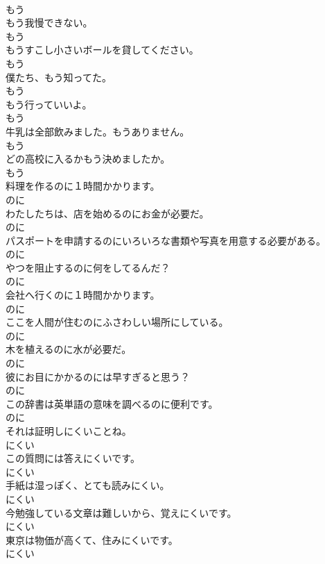 \documentclass[8pt]{extreport}
\begin{document}
\begin{CJK}{UTF8}{min}
\\	もう
\\	もう我慢できない。	
\\	もう
\\	もうすこし小さいボールを貸してください。	
\\	もう
\\	僕たち、もう知ってた。	
\\	もう
\\	もう行っていいよ。	
\\	もう
\\	牛乳は全部飲みました。もうありません。	
\\	もう
\\	どの高校に入るかもう決めましたか。	
\\	もう
\\	料理を作るのに１時間かかります。	
\\	のに
\\	わたしたちは、店を始めるのにお金が必要だ。	
\\	のに
\\	パスポートを申請するのにいろいろな書類や写真を用意する必要がある。	
\\	のに
\\	やつを阻止するのに何をしてるんだ？	
\\	のに
\\	会社へ行くのに１時間かかります。	
\\	のに
\\	ここを人間が住むのにふさわしい場所にしている。	
\\	のに
\\	木を植えるのに水が必要だ。	
\\	のに
\\	彼にお目にかかるのには早すぎると思う？	
\\	のに
\\	この辞書は英単語の意味を調べるのに便利です。	
\\	のに
\\	それは証明しにくいことね。	
\\	にくい
\\	この質問には答えにくいです。	
\\	にくい
\\	手紙は湿っぽく、とても読みにくい。	
\\	にくい
\\	今勉強している文章は難しいから、覚えにくいです。	
\\	にくい
\\	東京は物価が高くて、住みにくいです。	
\\	にくい

\end{CJK}
\end{document}
